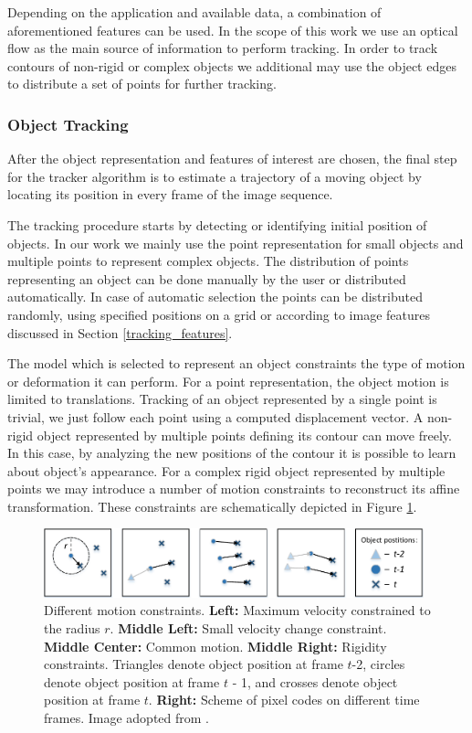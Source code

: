 Depending on the application and available data, a combination of aforementioned features can be used. In the scope of this work we use an optical flow as the main source of information to perform tracking. In order to track contours of non-rigid or complex objects we additional may use the object edges to distribute a set of points for further tracking.  

\subsubsection{Object Tracking}
\label{object_tracking}

After the object representation and features of interest are chosen, the final step for the tracker algorithm is to estimate a trajectory of a moving object by locating its position in every frame of the image sequence.

The tracking procedure starts by detecting or identifying initial position of objects. In our work we mainly use the point representation for small objects and multiple points to represent complex objects. The distribution of points representing an object can be done manually by the user or distributed automatically. In case of automatic selection the points can be distributed randomly, using specified positions on a grid or according to image features discussed in Section \ref{tracking_features}.
 
The model which is selected to represent an object constraints the type of motion or deformation it can perform. For a point representation, the object motion is limited to translations. Tracking of an object represented by a single point is trivial, we just follow each point using a computed displacement vector.
A non-rigid object represented by multiple points defining its contour can move freely. In this case, by analyzing the new positions of the contour it is possible to learn about object's appearance. For a complex rigid object represented by multiple points we may introduce a number of motion constraints  \cite{Yilmaz06} to reconstruct its affine transformation. These constraints are schematically depicted in Figure \ref{fig:motion_constraints}.  
  
\begin{figure}[ht]
  \centerline{
    \mbox{\includegraphics[width=0.98\textwidth]{figures/fig_38_p69.pdf}}
  }

  \caption[Noise filterst]{Different motion constraints. \textbf{Left:} Maximum velocity constrained to the radius $r$. \textbf{Middle Left:} Small velocity change constraint. \textbf{Middle Center:} Common motion. \textbf{Middle Right:} Rigidity constraints. Triangles denote object position at frame $t$-2, circles denote object position at frame $t$ - 1, and crosses  denote object position at frame $t$. \textbf{Right:} Scheme of pixel codes on different time frames. Image adopted from  \cite{Yilmaz06}.  }
  \label{fig:motion_constraints}
\end{figure}

